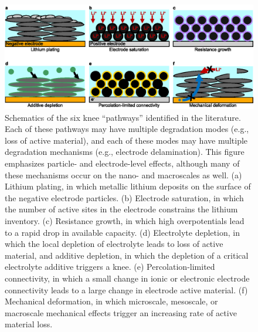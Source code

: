 \documentclass[journal=jpclcd,manuscript=article]{achemso}
\begin{document}
\begin{figure}[h!tb]
\centering
\includegraphics[scale=0.9]{figures/knee_pathways.eps}
\caption{Schematics of the six knee ``pathways'' identified in the literature. Each of these pathways may have multiple degradation modes (e.g., loss of active material), and each of these modes may have multiple degradation mechanisms (e.g., electrode delamination). This figure emphasizes particle- and electrode-level effects, although many of these mechanisms occur on the nano- and macroscales as well.
(a) Lithium plating, in which metallic lithium deposits on the surface of the negative electrode particles.
(b) Electrode saturation, in which the number of active sites in the electrode constrains the lithium inventory.
(c) Resistance growth, in which high overpotentials lead to a rapid drop in available capacity.
(d) Electrolyte depletion, in which the local depletion of electrolyte leads to loss of active material, and additive depletion, in which the depletion of a critical electrolyte additive triggers a knee.
(e) Percolation-limited connectivity, in which a small change in ionic or electronic electrode connectivity leads to a large change in electrode active material.
(f) Mechanical deformation, in which microscale, mesoscale, or macroscale mechanical effects trigger an increasing rate of active material loss.}
\label{fig:knee_pathways}
\end{figure}
\end{document}
